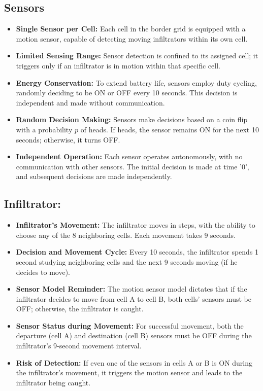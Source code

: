 \documentclass[12pt,a4paper]{article}
\begin{document}
\subsection{Sensors}
\begin{itemize}
    \item \textbf{Single Sensor per Cell:} Each cell in the border grid is equipped with a motion sensor, capable of detecting moving infiltrators within its own cell.
    
    \item \textbf{Limited Sensing Range:} Sensor detection is confined to its assigned cell; it triggers only if an infiltrator is in motion within that specific cell.
    
    \item \textbf{Energy Conservation:} To extend battery life, sensors employ duty cycling, randomly deciding to be ON or OFF every 10 seconds. This decision is independent and made without communication.
    
    \item \textbf{Random Decision Making:} Sensors make decisions based on a coin flip with a probability $p$ of heads. If heads, the sensor remains ON for the next 10 seconds; otherwise, it turns OFF.
    
    \item \textbf{Independent Operation:} Each sensor operates autonomously, with no communication with other sensors. The initial decision is made at time '0', and subsequent decisions are made independently.
\end{itemize}

\subsection{Infiltrator:}
\begin{itemize}
    \item \textbf{Infiltrator's Movement:} The infiltrator moves in steps, with the ability to choose any of the 8 neighboring cells. Each movement takes 9 seconds.
    
    \item \textbf{Decision and Movement Cycle:} Every 10 seconds, the infiltrator spends 1 second studying neighboring cells and the next 9 seconds moving (if he decides to move).
    
    \item \textbf{Sensor Model Reminder:} The motion sensor model dictates that if the infiltrator decides to move from cell A to cell B, both cells' sensors must be OFF; otherwise, the infiltrator is caught.
    
    \item \textbf{Sensor Status during Movement:} For successful movement, both the departure (cell A) and destination (cell B) sensors must be OFF during the infiltrator's 9-second movement interval.
    
    \item \textbf{Risk of Detection:} If even one of the sensors in cells A or B is ON during the infiltrator's movement, it triggers the motion sensor and leads to the infiltrator being caught.
\end{itemize}
\end{document}
